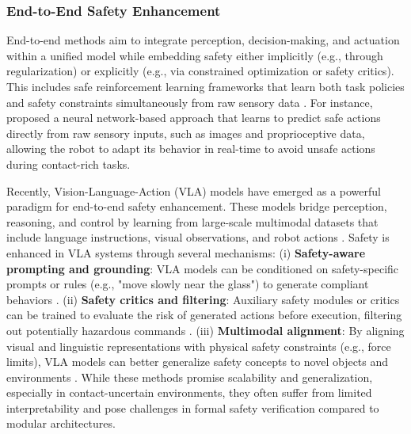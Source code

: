 \documentclass[Afour,sageh,times]{template/sagej}
\newcommand{\suggest}[1]{{\color{olive} (#1)}}
\begin{document}
\subsubsection{End-to-End Safety Enhancement}
End-to-end methods aim to integrate perception, decision-making, and actuation within a unified model while embedding safety either implicitly (e.g., through regularization) or explicitly (e.g., via constrained optimization or safety critics). 
This includes safe reinforcement learning frameworks that learn both task policies and safety constraints simultaneously from raw sensory data \cite{287, 99, 236}.
For instance, \citet{100} proposed a neural network-based approach that learns to predict safe actions directly from raw sensory inputs, such as images and proprioceptive data, allowing the robot to adapt its behavior in real-time to avoid unsafe actions during contact-rich tasks.


Recently, Vision-Language-Action (VLA) models have emerged as a powerful paradigm for end-to-end safety enhancement. 
These models bridge perception, reasoning, and control by learning from large-scale multimodal datasets that include language instructions, visual observations, and robot actions \cite{330, 33, 10705419}.
Safety is enhanced in VLA systems through several mechanisms:
(i) \textbf{Safety-aware prompting and grounding}: VLA models can be conditioned on safety-specific prompts or rules (e.g., "move slowly near the glass") to generate compliant behaviors \cite{8, 51}.
(ii) \textbf{Safety critics and filtering}: Auxiliary safety modules or critics can be trained to evaluate the risk of generated actions before execution, filtering out potentially hazardous commands \cite{376, 360, 115}.
(iii) \textbf{Multimodal alignment}: By aligning visual and linguistic representations with physical safety constraints (e.g., force limits), VLA models can better generalize safety concepts to novel objects and environments \cite{309, 307, 218}.
While these methods promise scalability and generalization, especially in contact-uncertain environments, they often suffer from limited interpretability and pose challenges in formal safety verification compared to modular architectures.
\end{document}

